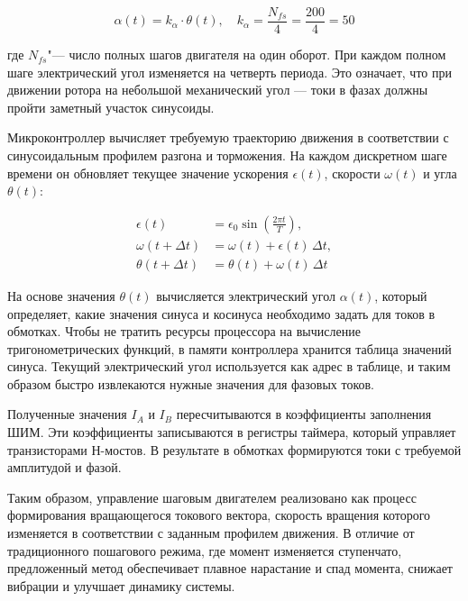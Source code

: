 \begin{equation}
	\label{eq:angle_electro}
	\alpha(t) =k_\alpha \cdot \theta(t),  \quad k_\alpha = \frac{N_{fs}}{4} = \frac{200}{4} = 50
\end{equation}

где \(N_{fs}\)"--- число полных шагов двигателя на один оборот. При каждом полном шаге электрический угол изменяется на четверть периода. Это означает, что при движении ротора на небольшой механический угол --- токи в фазах должны пройти заметный участок синусоиды.

Микроконтроллер вычисляет требуемую траекторию движения в соответствии с синусоидальным профилем разгона и торможения. На каждом дискретном шаге времени он обновляет текущее значение ускорения $\epsilon(t)$, скорости $\omega(t)$ и угла $\theta(t)$:

\begin{equation}
	\begin{aligned}
		\epsilon(t) &= \epsilon_0 \sin\!\left(\frac{2 \pi t}{T}\right), \\
		\omega(t + \Delta t) &= \omega(t) + \epsilon(t)\,\Delta t, \\
		\theta(t + \Delta t) &= \theta(t) + \omega(t)\,\Delta t
	\end{aligned}
\end{equation}


На основе значения $\theta(t)$ вычисляется электрический угол $\alpha(t)$, который определяет, какие значения синуса и косинуса необходимо задать для токов в обмотках. Чтобы не тратить ресурсы процессора на вычисление тригонометрических функций, в памяти контроллера хранится таблица значений синуса. Текущий электрический угол используется как адрес в таблице, и таким образом быстро извлекаются нужные значения для фазовых токов.

Полученные значения $I_A$ и $I_B$ пересчитываются в коэффициенты заполнения ШИМ. Эти коэффициенты записываются в регистры таймера, который управляет транзисторами Н-мостов. В результате в обмотках формируются токи с требуемой амплитудой и фазой.

Таким образом, управление шаговым двигателем реализовано как процесс формирования вращающегося токового вектора, скорость вращения которого изменяется в соответствии с заданным профилем движения. В отличие от традиционного пошагового режима, где момент изменяется ступенчато, предложенный метод обеспечивает плавное нарастание и спад момента, снижает вибрации и улучшает динамику системы.


